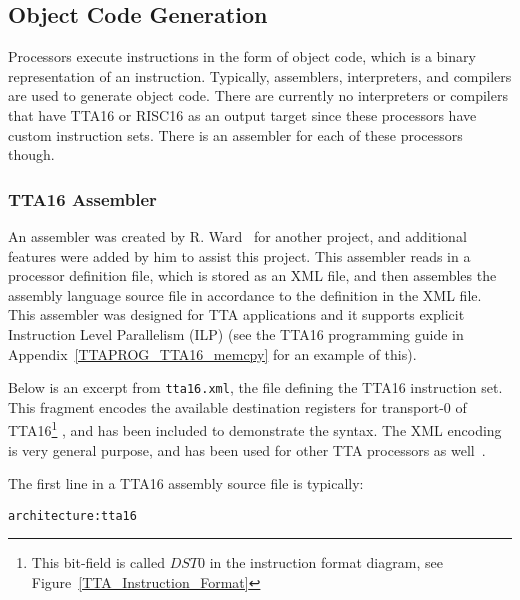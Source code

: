 \subsection{Object Code Generation}
Processors execute instructions in the form of object code, which is a binary
representation of an instruction. Typically, assemblers, interpreters, and
compilers are used to generate object code. There are currently no interpreters
or compilers that have TTA16 or RISC16 as an output target since these processors
have custom instruction sets. There is an assembler for each of these processors
though.

\subsubsection{TTA16 Assembler}

An assembler was created by R. Ward~\cite{XML_Assembler} for another project, and
additional features were added by him to assist this project. This assembler
reads in a processor definition file, which is stored as an XML file, and then
assembles the assembly language source file in accordance to the definition in
the XML file. This assembler was designed for TTA applications and it supports
explicit Instruction Level Parallelism (ILP) (see the TTA16 programming
guide in Appendix~\ref{TTAPROG_TTA16_memcpy} for an example of this).

Below is an excerpt from \texttt{tta16.xml}, the file defining the TTA16
instruction set. This fragment encodes the available destination registers for
transport-0 of TTA16\footnote{This bit-field is called $DST0$ in the instruction
format diagram, see Figure~\ref{TTA_Instruction_Format}} , and has been included
to demonstrate the syntax. The XML encoding is very general purpose, and has been
used for other TTA processors as well~\cite{TTA_Ray_Trace}.

\begin{center}
\begin{minipage}{0.8\linewidth}
\footnotesize

\normalsize
\end{minipage}
\end{center}

\noindent The first line in a TTA16 assembly source file is typically:
\begin{center}
\begin{minipage}{0.5\linewidth}
\begin{verbatim}
architecture:tta16
\end{verbatim}
\end{minipage}
\end{center}

